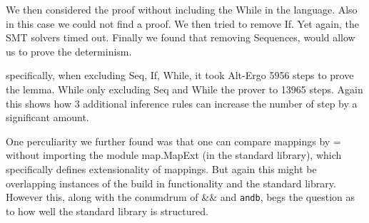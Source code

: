 We then considered the proof without including the While in the language. Also in this case we could not find a proof. We then tried to remove If. Yet again, the SMT solvers timed out. Finally we found that removing Sequences, would allow us to prove the determinism.

specifically, when excluding Seq, If, While, it took Alt-Ergo 5956 steps to prove the lemma.
While only excluding Seq and While the prover to 13965 steps. Again this shows how 3 additional inference rules
can increase the number of step by a significant amount.

One perculiarity we further found was that one can compare mappings by = without importing the module map.MapExt (in the standard library), which specifically defines extensionality of mappings.
But again this might be overlapping instances of the build in functionality and the standard library.
However this, along with the conumdrum of \&\& and \texttt{andb}, begs the question as to how well the
standard library is structured.
